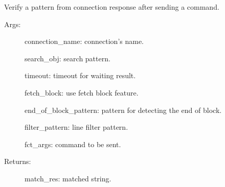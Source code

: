 \documentclass[letterpaper,10pt,english]{sphinxmanual}
\begin{document}
\begin{fulllineitems}
\begin{fulllineitems}
\end{fulllineitems}


\begin{fulllineitems}
\label{\detokenize{QConnectionLibrary:QConnectionLibrary.connection_manager.ConnectionManager.verify_unnamed_args}}
\sphinxAtStartPar
Verify a pattern from connection response after sending a command.
\begin{description}
\item[{Args:}] \leavevmode
\sphinxAtStartPar
connection\_name: connection’s name.

\sphinxAtStartPar
search\_obj: search pattern.

\sphinxAtStartPar
timeout: timeout for waiting result.

\sphinxAtStartPar
fetch\_block: use fetch block feature.

\sphinxAtStartPar
end\_of\_block\_pattern: pattern for detecting the end of block.

\sphinxAtStartPar
filter\_pattern: line filter pattern.

\sphinxAtStartPar
fct\_args: command to be sent.

\item[{Returns:}] \leavevmode
\sphinxAtStartPar
match\_res: matched string.

\end{description}

\end{fulllineitems}


\end{fulllineitems}

\end{document}
